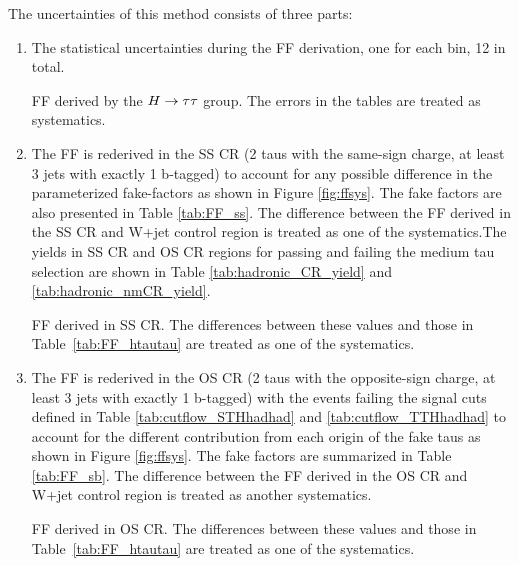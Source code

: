 The uncertainties of this method consists of three parts:
\begin{enumerate}

\item The statistical uncertainties during the FF derivation, one for each bin, 12 in total.

\begin{table}[H]
\caption{FF derived by the $H \rightarrow \tau\tau$ group. The errors in the tables are treated as systematics.}
\label{tab:FF_htautau}

\end{table}


\item The FF is rederived in the SS CR (2 taus with the same-sign charge, at least 3 jets with exactly 1 b-tagged) to account for any possible difference in 
  the parameterized fake-factors as shown in Figure \ref{fig:ffsys}. The fake factors are also presented in Table \ref{tab:FF_ss}. The difference between the FF
  derived in the SS CR and W+jet control region is treated as one of the systematics.The yields in SS CR and OS CR regions for passing and failing the medium tau selection are shown in Table \ref{tab:hadronic_CR_yield} and \ref{tab:hadronic_nmCR_yield}.

\begin{table}[H]
\caption{FF derived in SS CR. The differences between these values and those in Table~\ref{tab:FF_htautau} are treated as one of the systematics.}
\label{tab:FF_ss}

\end{table}



\item The FF is rederived in the OS CR (2 taus with the opposite-sign charge, at least 3 jets with exactly 1 b-tagged) with the events failing the signal cuts
  defined in Table \ref{tab:cutflow_STHhadhad} and \ref{tab:cutflow_TTHhadhad} to account for the different contribution from each origin of the fake taus as shown in Figure \ref{fig:ffsys}. The fake factors are summarized in Table \ref{tab:FF_sb}. The difference between the FF derived in the OS CR and W+jet control region is treated as another
  systematics.

\begin{table}[H]
\caption{FF derived in OS CR. The differences between these values and those in Table~\ref{tab:FF_htautau} are treated as one of the systematics.}
\label{tab:FF_sb}

\end{table}



\end{enumerate}



